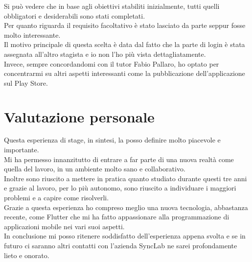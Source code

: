 Si può vedere che in base agli obiettivi stabiliti inizialmente, tutti quelli obbligatori e desiderabili sono stati completati.\\
Per quanto riguarda il requisito facoltativo è stato lasciato da parte seppur fosse molto interessante.\\
Il motivo principale di questa scelta è data dal fatto che la parte di login è stata assegnata all'altro stagista e io non l'ho più vista dettagliatamente.\\
Invece, sempre concordandomi con il tutor Fabio Pallaro, ho optato per concentrarmi su altri aspetti interessanti come la pubblicazione dell'applicazione sul Play Store.


\section{Valutazione personale}
Questa esperienza di stage, in sintesi, la posso definire molto piacevole e importante.\\
Mi ha permesso innanzitutto di entrare a far parte di una nuova realtà come quella del lavoro, in un ambiente molto sano e collaborativo.\\
Inoltre sono riuscito a mettere in pratica quanto studiato durante questi tre anni e grazie al lavoro, per lo più autonomo, sono riuscito a individuare i maggiori problemi e a capire come risolverli.\\
Grazie a questa esperienza ho compreso meglio una nuova tecnologia, abbastanza recente, come Flutter che mi ha fatto appassionare alla programmazione di applicazioni mobile nei vari suoi aspetti.\\
In conclusione mi posso ritenere soddisfatto dell'esperienza appena svolta e se in futuro ci saranno altri contatti con l'azienda SyncLab ne sarei profondamente lieto e onorato.



